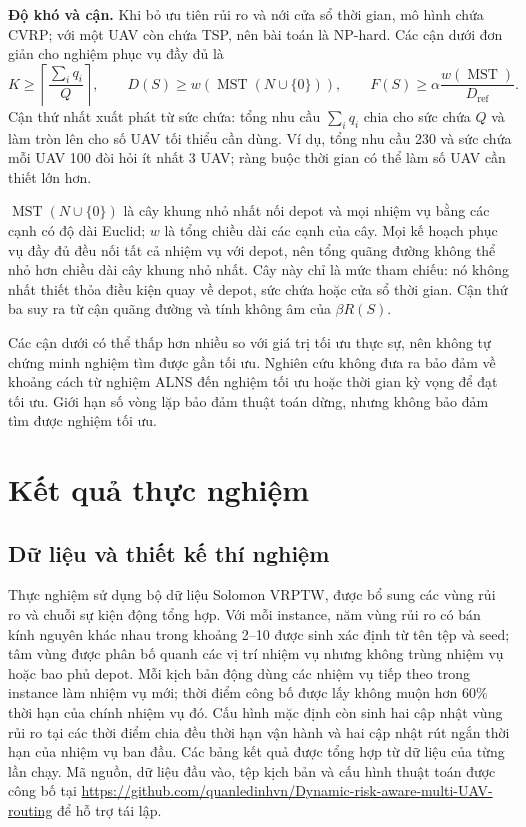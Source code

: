 \documentclass[11pt,a4paper]{article}
\begin{document}
\textbf{Độ khó và cận.} Khi bỏ ưu tiên rủi ro và nới cửa sổ thời gian, mô hình chứa CVRP; với một UAV còn chứa TSP, nên bài toán là NP-hard. Các cận dưới đơn giản cho nghiệm phục vụ đầy đủ là
\begin{equation}
 K\ge\left\lceil\frac{\sum_i q_i}{Q}\right\rceil,\qquad
 D(S)\ge w(\operatorname{MST}(N\cup\{0\})),\qquad
 F(S)\ge\alpha\frac{w(\operatorname{MST})}{D_{\mathrm{ref}}}.
\end{equation}
Cận thứ nhất xuất phát từ sức chứa: tổng nhu cầu $\sum_i q_i$ chia cho sức chứa $Q$ và làm tròn lên cho số UAV tối thiểu cần dùng. Ví dụ, tổng nhu cầu 230 và sức chứa mỗi UAV 100 đòi hỏi ít nhất 3 UAV; ràng buộc thời gian có thể làm số UAV cần thiết lớn hơn.

$\operatorname{MST}(N\cup\{0\})$ là cây khung nhỏ nhất nối depot và mọi nhiệm vụ bằng các cạnh có độ dài Euclid; $w$ là tổng chiều dài các cạnh của cây. Mọi kế hoạch phục vụ đầy đủ đều nối tất cả nhiệm vụ với depot, nên tổng quãng đường không thể nhỏ hơn chiều dài cây khung nhỏ nhất. Cây này chỉ là mức tham chiếu: nó không nhất thiết thỏa điều kiện quay về depot, sức chứa hoặc cửa sổ thời gian. Cận thứ ba suy ra từ cận quãng đường và tính không âm của $\beta R(S)$.

Các cận dưới có thể thấp hơn nhiều so với giá trị tối ưu thực sự, nên không tự chứng minh nghiệm tìm được gần tối ưu. Nghiên cứu không đưa ra bảo đảm về khoảng cách từ nghiệm ALNS đến nghiệm tối ưu hoặc thời gian kỳ vọng để đạt tối ưu. Giới hạn số vòng lặp bảo đảm thuật toán dừng, nhưng không bảo đảm tìm được nghiệm tối ưu.

\section{Kết quả thực nghiệm}
\subsection{Dữ liệu và thiết kế thí nghiệm}
Thực nghiệm sử dụng bộ dữ liệu Solomon VRPTW, được bổ sung các vùng rủi ro và chuỗi sự kiện động tổng hợp. Với mỗi instance, năm vùng rủi ro có bán kính nguyên khác nhau trong khoảng 2--10 được sinh xác định từ tên tệp và seed; tâm vùng được phân bố quanh các vị trí nhiệm vụ nhưng không trùng nhiệm vụ hoặc bao phủ depot. Mỗi kịch bản động dùng các nhiệm vụ tiếp theo trong instance làm nhiệm vụ mới; thời điểm công bố được lấy không muộn hơn 60\% thời hạn của chính nhiệm vụ đó. Cấu hình mặc định còn sinh hai cập nhật vùng rủi ro tại các thời điểm chia đều thời hạn vận hành và hai cập nhật rút ngắn thời hạn của nhiệm vụ ban đầu. Các bảng kết quả được tổng hợp từ dữ liệu của từng lần chạy. Mã nguồn, dữ liệu đầu vào, tệp kịch bản và cấu hình thuật toán được công bố tại \url{https://github.com/quanledinhvn/Dynamic-risk-aware-multi-UAV-routing} để hỗ trợ tái lập.
\end{document}
